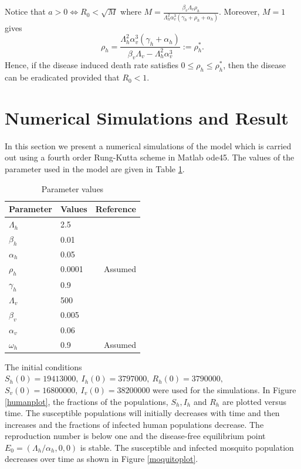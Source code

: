 \documentclass[review]{elsarticle}
\begin{document}
Notice that $a>0\Leftrightarrow R_0<\sqrt{M}$ where $M=\frac{\beta_v\Lambda_v\rho_h}{\Lambda_h^2\alpha_v^3(\gamma_h+\rho_h+\alpha_h)}$. Moreover, $M=1$ gives
\[\rho_h=\frac{\Lambda_h^2\alpha_v^3(\gamma_h+\alpha_h)}{\beta_v\Lambda_v-\Lambda_h^2\alpha_v^3}:=\rho_h^*.\]
Hence, if the disease induced death rate satisfies $0\leq \rho_h\leq \rho_h^*$, then the disease can be eradicated provided that $R_0<1$.

\section{Numerical Simulations and Result}

In this section we present a numerical simulations of the model which is carried out using a fourth order Rung-Kutta scheme in
Matlab ode45. The values of the parameter used in the model are given in Table \ref{tab:par-value}.
\begin{table}[htb!]
\centering
\caption{Parameter values}\label{tab:par-value}
\begin{tabular}{p{5cm} p{5cm} r}
\hline
Parameter    &  Values  &  Reference           \\  \hline
$\Lambda_h$  & 2.5       & \cite{Lashari2011}  \\
$\beta_h$    & 0.01     &  \cite{Yang}         \\
$\alpha_h$   & 0.05     & \cite{Macdonald57}   \\
$\rho_h$     & 0.0001   &  Assumed             \\
$\gamma_h$   & 0.9      &  \cite{Gebre}        \\
$\Lambda_v$  & 500      & \cite{Lashari2011}   \\
$\beta_v$    & 0.005    & \cite{Yang}          \\
$\alpha_v$   & 0.06     &  \cite{Macdonald57}  \\
$\omega_h$   & 0.9      &  Assumed             \\ \hline
\end{tabular}
\end{table}

The initial conditions $S_h(0)=19413000 ,\ I_h(0)=3797000,\ R_h(0)=3790000,$ $ S_v(0)=16800000,\ I_v(0)=38200000$ were used for the simulations. In Figure \ref{humanplot}, the fractions of the populations, $S_h,I_h$ and $R_h$ are plotted versus time. The susceptible populations will initially decreases with time and then increases and the fractions of infected human populations decrease. The reproduction number is below one and the disease-free equilibrium point $E_0=(\Lambda_h/\alpha_h ,0,0)$ is stable. The susceptible and infected mosquito population decreases over time as shown in Figure \ref{moquitoplot}.
\end{document}
